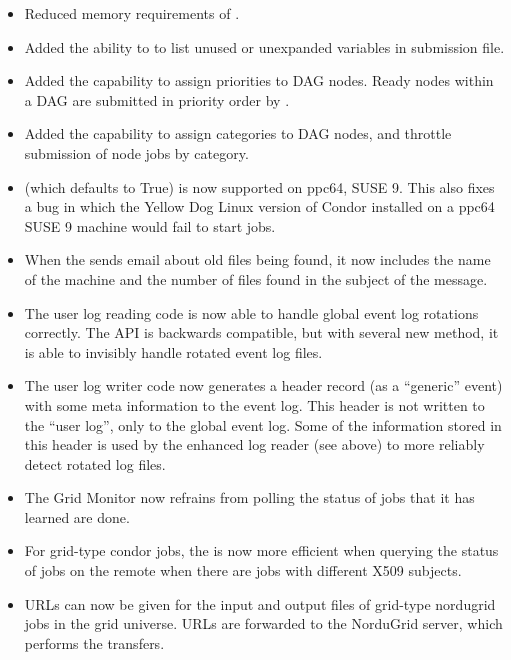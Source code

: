 \begin{itemize}
\item Reduced memory requirements of .

\item Added the ability to  to list unused or unexpanded 
  variables in submission file.

\item Added the capability to assign priorities to DAG nodes.  Ready nodes
within a DAG are submitted in priority order by .

\item Added the capability to assign categories to DAG nodes, and
throttle submission of node jobs by category.

\item {} (which defaults to
True) is now supported on ppc64, SUSE 9.  This also fixes a bug in which
the Yellow Dog Linux version of Condor installed on a ppc64 SUSE 9 machine
would fail to start jobs.

\item When the  sends email about old files being found, it
now includes the name of the machine and the number of files found in the
subject of the message.

\item The user log reading code is now able to handle global event log
  rotations correctly.  The API is backwards compatible, but with
  several new method, it is able to invisibly handle rotated event log
  files.

\item The user log writer code now generates a header record (as a
  ``generic'' event) with some meta information to the event log.
  This header is not written to the ``user log'', only to the global
  event log.  Some of the information stored in this header is used by
  the enhanced log reader (see above) to more reliably detect rotated
  log files.

\item The Grid Monitor now refrains from polling the status of jobs that
it has learned are done.

\item For grid-type condor jobs, the  is now more
efficient when querying the status of jobs on the remote 
when there are jobs with different X509 subjects.

\item URLs can now be given for the input and output files of grid-type
nordugrid jobs in the grid universe. URLs are forwarded to the NorduGrid
server, which performs the transfers.


\end{itemize}
